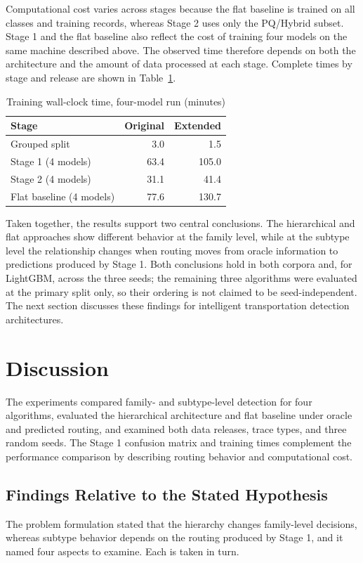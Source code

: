 \documentclass{IEEEoj}
\begin{document}


Computational cost varies across stages because the flat baseline is trained on
all classes and training records, whereas Stage 2 uses only the PQ/Hybrid
subset. Stage 1 and the flat baseline also reflect the cost of training four
models on the same machine described above. The observed time therefore
depends on both the architecture and the amount of data processed at each
stage. Complete times by stage and release are shown in Table~\ref{tab:runtime}.

\begin{table}[!t]
\caption{Training wall-clock time, four-model run (minutes)}
\label{tab:runtime}
\centering
\begin{tabular}{lrr}
\toprule
Stage & Original & Extended \\
\midrule
Grouped split & 3.0 & 1.5 \\
Stage 1 (4 models) & 63.4 & 105.0 \\
Stage 2 (4 models) & 31.1 & 41.4 \\
Flat baseline (4 models) & 77.6 & 130.7 \\
\bottomrule
\end{tabular}
\end{table}

Taken together, the results support two central conclusions. The hierarchical
and flat approaches show different behavior at the family level, while at the
subtype level the relationship changes when routing moves from oracle
information to predictions produced by Stage 1. Both conclusions hold in both
corpora and, for LightGBM, across the three seeds; the remaining three
algorithms were evaluated at the primary split only, so their ordering is not
claimed to be seed-independent. The next section discusses these findings for
intelligent transportation detection architectures.

\section{Discussion}
The experiments compared family- and subtype-level detection for four
algorithms, evaluated the hierarchical architecture and flat baseline under
oracle and predicted routing, and examined both data releases, trace types,
and three random seeds. The Stage 1 confusion matrix and training times
complement the performance comparison by describing routing behavior and
computational cost.

\subsection{Findings Relative to the Stated Hypothesis}
The problem formulation stated that the hierarchy changes family-level
decisions, whereas subtype behavior depends on the routing produced by
Stage 1, and it named four aspects to examine. Each is taken in turn.
\end{document}
